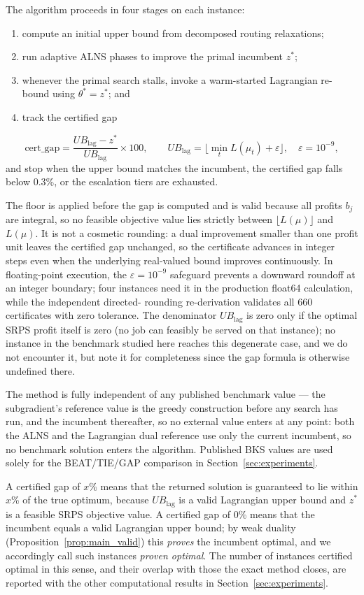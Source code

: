 \documentclass[preprint,12pt]{elsarticle}
\begin{document}
The algorithm proceeds in four stages on each instance:
\begin{enumerate}
    \item compute an initial upper bound from decomposed routing relaxations;
    \item run adaptive ALNS phases to improve the primal incumbent $z^*$;
    \item whenever the primal search stalls, invoke a warm-started Lagrangian re-bound using $\theta^*=z^*$; and
    \item track the certified gap
\end{enumerate}
\[
\text{cert\_gap} = \frac{UB_{\text{lag}}-z^*}{UB_{\text{lag}}}\times 100,
\qquad UB_{\text{lag}} = \bigl\lfloor \min_t L(\mu_t) + \varepsilon \bigr\rfloor,\quad \varepsilon=10^{-9},
\]
and stop when the upper bound matches the incumbent, the certified gap falls below 0.3\%, or the escalation tiers are exhausted.

The floor is applied before the gap is computed and is valid because all profits
$b_j$ are integral, so no feasible objective value lies strictly between
$\lfloor L(\mu)\rfloor$ and $L(\mu)$. It is not a cosmetic rounding: a dual
improvement smaller than one profit unit leaves the certified gap unchanged, so
the certificate advances in integer steps even when the underlying real-valued
bound improves continuously. In floating-point execution, the $\varepsilon=10^{-9}$
safeguard prevents a downward roundoff at an integer boundary; four instances
need it in the production float64 calculation, while the independent directed-
rounding re-derivation validates all 660 certificates with zero tolerance. The denominator $UB_{\text{lag}}$ is zero only if
the optimal SRPS profit itself is zero (no job can feasibly be served on that
instance); no instance in the benchmark studied here reaches this degenerate
case, and we do not encounter it, but note it for completeness since the gap
formula is otherwise undefined there.

The method is fully independent of any published benchmark value --- the
subgradient's reference value is the greedy construction before any search has
run, and the incumbent thereafter, so no external value enters at any point:
both the ALNS and
the Lagrangian dual reference use only the current incumbent, so no benchmark
solution enters the algorithm. Published BKS values are used solely for the
BEAT/TIE/GAP comparison in Section~\ref{sec:experiments}.

A certified gap of $x$\% means that the returned solution is guaranteed to lie within
$x$\% of the true optimum, because $UB_{\text{lag}}$ is a valid Lagrangian upper
bound and $z^*$ is a feasible SRPS objective value. A certified gap of $0$\% means
that the incumbent equals a valid Lagrangian upper bound; by weak duality
(Proposition~\ref{prop:main_valid}) this \emph{proves} the incumbent optimal, and we
accordingly call such instances \emph{proven optimal}. The number of instances certified
optimal in this sense, and their overlap with those the exact method closes, are
reported with the other computational results in Section~\ref{sec:experiments}.
\end{document}
